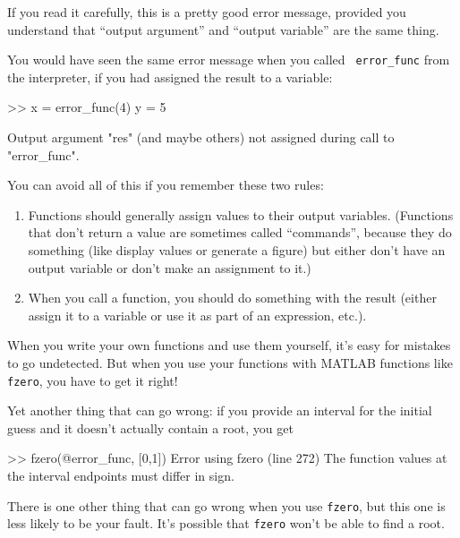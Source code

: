 If you read it carefully, this is a pretty good error message,
provided you understand that ``output argument'' and ``output variable'' are the same thing.


You would have seen the same error message when you called {\tt
error\_func} from the interpreter, if you had assigned the result
to a variable:

\begin{code}
>> x = error_func(4)
y = 5

Output argument "res" (and maybe others) not assigned during
call to "error_func".
\end{code}

You can avoid all of this if you remember these two rules:

\begin{enumerate}

\item Functions should generally assign values to their output
variables. (Functions that don't return a value are sometimes
called ``commands'', because they do something (like display
values or generate a figure) but either don't have an output
variable or don't make an assignment to it.)

\item When you call a function, you should do something with
the result (either assign it to a variable or use it as part of an
expression, etc.).

\end{enumerate}

When you write your own functions and use them yourself, it's easy
for mistakes to go undetected.  But when you use your functions with
MATLAB functions like {\tt fzero}, you have to get it right!

Yet another thing that can go wrong: if you provide an interval for the
initial guess and it doesn't actually contain a root, you get

\begin{code}
>> fzero(@error_func, [0,1])
Error using fzero (line 272)
The function values at the interval endpoints must differ in sign.
\end{code}


There is one other thing that can go wrong when you use {\tt fzero}, but
this one is less likely to be your fault.  It's possible that {\tt fzero}
won't be able to find a root.

